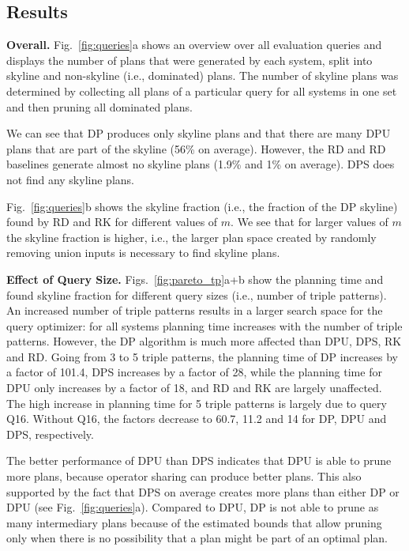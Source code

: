 \subsection{Results}

\textbf{Overall.} Fig.~\ref{fig:queries}a shows an overview over all
evaluation queries and displays the number of plans that were
generated by each system, split into skyline and non-skyline (i.e.,
dominated) plans. The number of skyline plans was determined by
collecting all plans of a particular query for all systems in one set
and then pruning all dominated plans. 

We can see that DP produces only skyline plans and that there are many
DPU plans that are part of the skyline (56\% on average). However, the
RD and RD baselines generate almost no skyline plans (1.9\% and 1\% on
average). DPS does not find any skyline plans.

Fig.~\ref{fig:queries}b shows the skyline fraction (i.e., the fraction
of the DP skyline) found by RD and RK for different values of $m$. We
see that for larger values of $m$ the skyline fraction is higher,
i.e., the larger plan space created by randomly removing union inputs
is necessary to find skyline plans.

\textbf{Effect of Query Size.} Figs.~\ref{fig:pareto_tp}a+b show the
planning time and found skyline fraction for different query sizes
(i.e., number of triple patterns). An increased number of triple
patterns results in a larger search space for the query optimizer: for
all systems planning time increases with the number of triple
patterns. However, the DP algorithm is much more affected than DPU,
DPS, RK and RD. Going from 3 to 5 triple patterns, the planning time
of DP increases by a factor of 101.4, DPS increases by a factor of 28,
while the planning time for DPU only increases by a factor of 18, and
RD and RK are largely unaffected. The high increase in planning time
for 5 triple patterns is largely due to query Q16. Without Q16, the
factors decrease to 60.7, 11.2 and 14 for DP, DPU and DPS,
respectively.

The better performance of DPU than DPS indicates that DPU is able to
prune more plans, because operator sharing can produce better
plans. This also supported by the fact that DPS on average creates
more plans than either DP or DPU (see
Fig.~\ref{fig:queries}a). Compared to DPU, DP is not able to prune as
many intermediary plans because of the estimated bounds that allow
pruning only when there is no possibility that a plan might be part of
an optimal plan.

